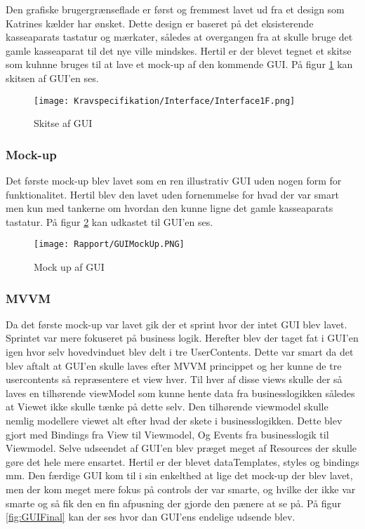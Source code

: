 Den grafiske brugergrænseflade er først og fremmest lavet ud fra et design som Katrines kælder
har ønsket. Dette design er baseret på det eksisterende kasseaparats tastatur og mærkater, således
at overgangen fra at skulle bruge det gamle kasseaparat til det nye ville mindskes.
Hertil er der blevet tegnet et skitse som kuhnne bruges til at lave et mock-up af den kommende GUI. På figur \ref{fig:GUTskitse} kan skitsen af GUI'en ses.\newline

\begin{figure}[H]
\centering
	\texttt{[image: Kravspecifikation/Interface/Interface1F.png]}
	\caption{Skitse af GUI}
	\label{fig:GUTskitse}
\end{figure}

\subsubsection{Mock-up}
Det første mock-up blev lavet som en ren illustrativ GUI uden nogen form for funktionalitet. Hertil
blev den lavet uden fornemmelse for hvad der var smart men kun med tankerne om hvordan den
kunne ligne det gamle kasseaparats tastatur. På figur \ref{fig:GUIMock} kan udkastet til GUI'en ses.
\begin{figure}[H]
\centering
	\texttt{[image: Rapport/GUIMockUp.PNG]}
	\caption{Mock up af GUI}
	\label{fig:GUIMock}
\end{figure}
\subsubsection{MVVM}
Da det første mock-up var lavet gik der et sprint hvor der intet GUI blev lavet. Sprintet var mere fokuseret på business logik. Herefter blev der taget fat i GUI’en igen hvor selv hovedvinduet blev delt i tre
UserContents. Dette var smart da det blev aftalt at GUI’en skulle laves efter MVVM princippet
og her kunne de tre usercontents så repræsentere et view hver. Til hver af disse views skulle der så
laves en tilhørende viewModel som kunne hente data fra businesslogikken således at Viewet ikke
skulle tænke på dette selv. Den tilhørende viewmodel skulle nemlig modellere viewet alt efter hvad
der skete i businesslogikken. Dette blev gjort med Bindings fra View til Viewmodel, Og Events fra
businesslogik til Viewmodel.
Selve udseendet af GUI’en blev præget meget af Resources der skulle gøre det hele mere ensartet.
Hertil er der blevet dataTemplates, styles og bindings mm.
Den færdige GUI kom til i sin enkelthed at lige det mock-up der blev lavet, men der kom meget
mere fokus på controls der var smarte, og hvilke der ikke var smarte og så fik den en fin
afpusning der gjorde den pænere at se på. På figur \ref{fig:GUIFinal} kan der ses hvor dan GUI'ens endelige udsende blev.

